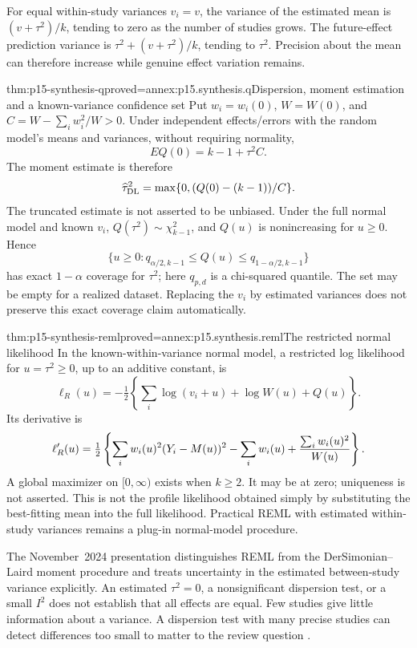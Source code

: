For equal within-study variances \(v_i=v\), the variance of the estimated
mean is \((v+\tau^2)/k\), tending to zero as the number of studies grows.
The future-effect prediction variance is \(\tau^2+(v+\tau^2)/k\),
tending to \(\tau^2\). Precision about the mean can therefore increase
while genuine effect variation remains.

\begin{hbtheorem}{thm:p15-synthesis-q}{proved=annex:p15.synthesis.q}{Dispersion, moment estimation and a known-variance confidence set}
Put \(w_i=w_i(0)\), \(W=W(0)\), and
\(C=W-\sum_iw_i^2/W>0\). Under independent effects/errors with
the random model's means and variances, without requiring normality,
\[
                    E Q(0)=k-1+\tau^2C.
\]
The moment estimate is therefore
\[
 \widehat\tau_{\rm DL}^2
    =\max\{0,(Q(0)-(k-1))/C\}.
\]
The truncated estimate is not asserted to be unbiased. Under the full normal
model and known \(v_i\), \(Q(\tau^2)\sim\chi^2_{k-1}\), and
\(Q(u)\) is nonincreasing for \(u\geq0\). Hence
\[
 \{u\geq0:q_{\alpha/2,k-1}\leq Q(u)
                         \leq q_{1-\alpha/2,k-1}\}
\]
has exact \(1-\alpha\) coverage for \(\tau^2\); here
\(q_{p,d}\) is a chi-squared quantile. The set may be empty for a
realized dataset. Replacing the \(v_i\) by estimated variances does not
preserve this exact coverage claim automatically.
\end{hbtheorem}

\begin{hbtheorem}{thm:p15-synthesis-reml}{proved=annex:p15.synthesis.reml}{The restricted normal likelihood}
In the known-within-variance normal model, a restricted log likelihood for
\(u=\tau^2\geq0\), up to an additive constant, is
\[
 \ell_R(u)=-\tfrac12\left\{
       \sum_i\log(v_i+u)+\log W(u)+Q(u)\right\}.
\]
Its derivative is
\[
 \ell_R'(u)=\tfrac12\left\{
  \sum_iw_i(u)^2(Y_i-M(u))^2
       -\sum_iw_i(u)+{\sum_iw_i(u)^2\over W(u)}\right\}.
\]
A global maximizer on \([0,\infty)\) exists when \(k\geq2\).
It may be at zero; uniqueness is not asserted. This is not the profile
likelihood obtained simply by substituting the best-fitting mean into the
full likelihood. Practical REML with estimated within-study variances remains
a plug-in normal-model procedure.
\end{hbtheorem}

The November~2024 presentation distinguishes REML from the
DerSimonian--Laird moment procedure and treats uncertainty in the estimated
between-study variance explicitly. An estimated \(\tau^2=0\), a
nonsignificant dispersion test, or a small \(I^2\) does not establish that
all effects are equal. Few studies give little information about a variance.
A dispersion test with many precise studies can detect differences too small
to matter to the review question
\cite[secs.~10.10.2, 10.10.4.4--10.10.4.5]{DeeksEtAl2024Cochrane10}.

